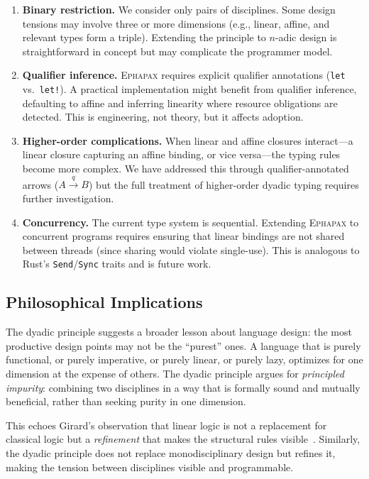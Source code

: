 \documentclass[11pt,a4paper]{article}
\newcommand{\Ephapax}{\textsc{Ephapax}}
\begin{document}
\begin{enumerate}
  \item \textbf{Binary restriction.} We consider only pairs of disciplines.
    Some design tensions may involve three or more dimensions (e.g., linear,
    affine, and relevant types form a triple). Extending the principle to
    $n$-adic design is straightforward in concept but may complicate the
    programmer model.

  \item \textbf{Qualifier inference.} \Ephapax{} requires explicit qualifier
    annotations (\lstinline{let} vs.\ \lstinline{let!}). A practical
    implementation might benefit from qualifier inference, defaulting to affine
    and inferring linearity where resource obligations are detected. This is
    engineering, not theory, but it affects adoption.

  \item \textbf{Higher-order complications.} When linear and affine closures
    interact---a linear closure capturing an affine binding, or vice versa---the
    typing rules become more complex. We have addressed this through
    qualifier-annotated arrows ($A \xrightarrow{q} B$) but the full treatment
    of higher-order dyadic typing requires further investigation.

  \item \textbf{Concurrency.} The current type system is sequential. Extending
    \Ephapax{} to concurrent programs requires ensuring that linear bindings are
    not shared between threads (since sharing would violate single-use). This is
    analogous to Rust's \lstinline{Send}/\lstinline{Sync} traits and is future
    work.
\end{enumerate}

\subsection{Philosophical Implications}

The dyadic principle suggests a broader lesson about language design: the most
productive design points may not be the ``purest'' ones. A language that is
purely functional, or purely imperative, or purely linear, or purely lazy,
optimizes for one dimension at the expense of others. The dyadic principle
argues for \emph{principled impurity}: combining two disciplines in a way that
is formally sound and mutually beneficial, rather than seeking purity in one
dimension.

This echoes Girard's observation that linear logic is not a replacement for
classical logic but a \emph{refinement} that makes the structural rules
visible~\citep{girard1987linear}. Similarly, the dyadic principle does not
replace monodisciplinary design but refines it, making the tension between
disciplines visible and programmable.
\end{document}
